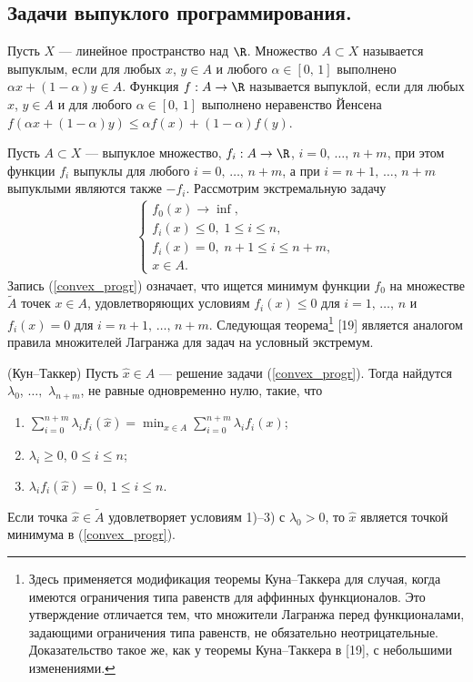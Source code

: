 \documentclass[a4paper
]{article}
\begin{document}
\subsection{Задачи выпуклого программирования.}
\label{sect_conv_prog}
Пусть $X$ --- линейное пространство над $\R$. Множество $A\subset
X$ называется выпуклым, если для любых $x$, $y\in A$ и любого
$\alpha\in [0, \, 1]$ выполнено $\alpha x+(1-\alpha)y\in A$.
Функция $f:A\rightarrow \R$ называется выпуклой, если для любых
$x$, $y\in A$ и для любого $\alpha \in [0, \, 1]$ выполнено
неравенство Йенсена $f(\alpha x+(1-\alpha)y)\le \alpha f(x)+
(1-\alpha)f(y)$. \par
Пусть $A\subset X$ --- выпуклое множество, $f_i:A\rightarrow \R$,
$i=0, \, \dots, \, n+m$, при этом функции $f_i$ выпуклы для любого
$i=0, \, \dots, \, n+m$, а при $i=n+1, \, \dots, \, n+m$ выпуклыми
являются также $-f_i$. Рассмотрим экстремальную задачу
\begin{align}
\label{convex_progr}
\left\{ \begin{array}{l} f_0(x)\rightarrow \inf, \\ f_i(x)\le 0, \;
1\le i\le n, \\ f_i(x)=0, \; n+1\le i\le n+m, \\ x\in A. \end{array}\right.
\end{align}
Запись (\ref{convex_progr}) означает, что ищется минимум функции
$f_0$ на множестве $\tilde A$ точек $x\in A$, удовлетворяющих условиям $f_i(x)
\le 0$ для $i=1, \, \dots, \, n$ и $f_i(x)=0$ для $i=n+1, \, \dots, \, n+m$.
Следующая теорема\footnote{Здесь
применяется модификация теоремы Куна--Таккера для случая, когда
имеются ограничения типа равенств для аффинных функционалов. Это
утверждение отличается тем, что множители Лагранжа перед
функционалами, задающими ограничения типа равенств, не обязательно
неотрицательные. Доказательство такое же, как у теоремы
Куна--Таккера в [19], с небольшими изменениями.} [19] является
аналогом правила множителей Лагранжа для задач на условный экстремум.
\begin{Trm}
(Кун--Таккер)
Пусть $\hat x\in A$ --- решение задачи (\ref{convex_progr}). Тогда
найдутся $\lambda_0$, $\dots,$ $\lambda_{n+m}$, не равные одновременно
нулю, такие, что
\begin{enumerate}
\item $\sum \limits_{i=0}^{n+m} \lambda_i f_i(\hat x)=\min_{x\in A}
\sum \limits_{i=0}^{n+m} \lambda_i f_i(x)$;
\item $\lambda_i\ge 0$, $0\le i\le n$;
\item $\lambda_i f_i(\hat x)=0$, $1\le i\le n$.
\end{enumerate}
Если точка $\hat x\in \tilde A$ удовлетворяет условиям 1)--3) с
$\lambda_0>0$, то $\hat x$ является точкой минимума в (\ref{convex_progr}).
\end{Trm}
\end{document}
